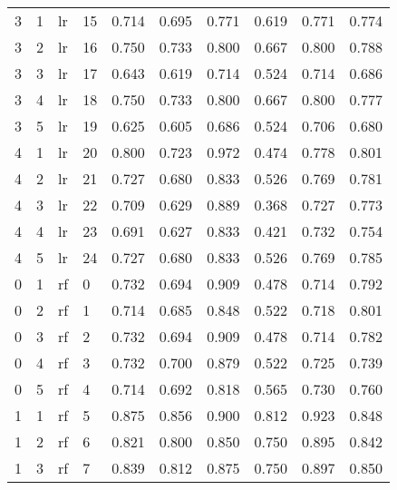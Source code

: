 \begin{table}[ht]
\begin{adjustbox}{width=\textwidth}
\begin{tabular}{llllrrrrrr}
   3 &           1 &    lr &          15 & 0.714 &  0.695 &        0.771 &       
 0.619 & 0.771 & 0.774 \\
   3 &           2 &    lr &          16 & 0.750 &  0.733 &        0.800 &       
 0.667 & 0.800 & 0.788 \\
   3 &           3 &    lr &          17 & 0.643 &  0.619 &        0.714 &       
 0.524 & 0.714 & 0.686 \\
   3 &           4 &    lr &          18 & 0.750 &  0.733 &        0.800 &       
 0.667 & 0.800 & 0.777 \\
   3 &           5 &    lr &          19 & 0.625 &  0.605 &        0.686 &       
 0.524 & 0.706 & 0.680 \\
   4 &           1 &    lr &          20 & 0.800 &  0.723 &        0.972 &       
 0.474 & 0.778 & 0.801 \\
   4 &           2 &    lr &          21 & 0.727 &  0.680 &        0.833 &       
 0.526 & 0.769 & 0.781 \\
   4 &           3 &    lr &          22 & 0.709 &  0.629 &        0.889 &       
 0.368 & 0.727 & 0.773 \\
   4 &           4 &    lr &          23 & 0.691 &  0.627 &        0.833 &       
 0.421 & 0.732 & 0.754 \\
   4 &           5 &    lr &          24 & 0.727 &  0.680 &        0.833 &       
 0.526 & 0.769 & 0.785 \\
   0 &           1 &    rf &           0 & 0.732 &  0.694 &        0.909 &       
 0.478 & 0.714 & 0.792 \\
   0 &           2 &    rf &           1 & 0.714 &  0.685 &        0.848 &       
 0.522 & 0.718 & 0.801 \\
   0 &           3 &    rf &           2 & 0.732 &  0.694 &        0.909 &       
 0.478 & 0.714 & 0.782 \\
   0 &           4 &    rf &           3 & 0.732 &  0.700 &        0.879 &       
 0.522 & 0.725 & 0.739 \\
   0 &           5 &    rf &           4 & 0.714 &  0.692 &        0.818 &       
 0.565 & 0.730 & 0.760 \\
   1 &           1 &    rf &           5 & 0.875 &  0.856 &        0.900 &       
 0.812 & 0.923 & 0.848 \\
   1 &           2 &    rf &           6 & 0.821 &  0.800 &        0.850 &       
 0.750 & 0.895 & 0.842 \\
   1 &           3 &    rf &           7 & 0.839 &  0.812 &        0.875 &       
 0.750 & 0.897 & 0.850 \\

\end{tabular}
\end{adjustbox}
\end{table}
